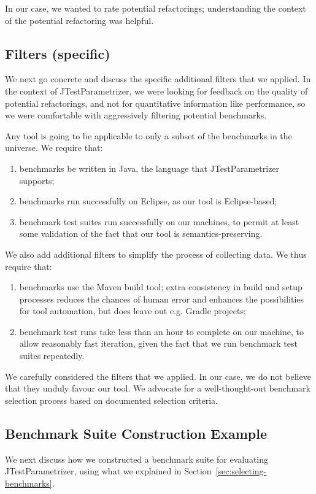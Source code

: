 In our case, we wanted to rate potential refactorings; understanding the context of the potential refactoring was helpful.

\subsection{Filters (specific)}
We next go concrete and discuss the specific additional filters that we applied.
In the context of JTestParametrizer, we were looking for feedback on the quality of potential refactorings, and not for quantitative information like performance, so we were comfortable with aggressively filtering potential benchmarks.

Any tool is going to be applicable to only a subset of the benchmarks in the universe. We require that:
\begin{enumerate}
\item benchmarks be written in Java, the language that JTestParametrizer supports;
\item benchmarks run successfully on Eclipse, as our tool is Eclipse-based;
\item benchmark test suites run successfully on our machines, to permit at least some validation of the fact that our tool is semantics-preserving.
\end{enumerate}
We also add additional filters to simplify the process of collecting data. We thus require that:
\begin{enumerate}
\item benchmarks use the Maven build tool; extra consistency in build and setup processes reduces the chances of human error and enhances the possibilities for tool automation, but does leave out e.g. Gradle projects;
\item benchmark test runs take less than an hour to complete on our machine, to allow reasonably fast iteration, given the fact that we run benchmark test suites repeatedly.
\end{enumerate}
We carefully considered the filters that we applied. In our case, we do not believe that they unduly favour our tool. We advocate for a well-thought-out benchmark selection process based on documented selection criteria.

\subsection{Benchmark Suite Construction Example}
We next discuss how we constructed a benchmark suite for evaluating JTestParametrizer, using what we explained in Section~\ref{sec:selecting-benchmarks}.

